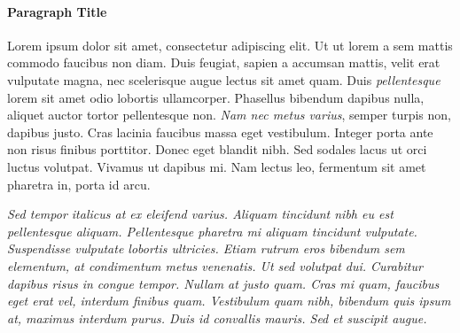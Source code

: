 \documentclass{article}
\begin{document}
\paragraph{Paragraph Title}
  Lorem ipsum dolor sit amet, consectetur adipiscing elit. Ut ut lorem a sem
  mattis commodo faucibus non diam. Duis feugiat, sapien a accumsan mattis,
  velit erat vulputate magna, nec scelerisque augue lectus sit amet quam. 
  Duis \textit{pellentesque} lorem sit amet odio lobortis ullamcorper. 
  Phasellus bibendum dapibus nulla, aliquet auctor tortor pellentesque non. 
  \textit{Nam nec metus varius}, semper turpis non, dapibus 
  justo. Cras lacinia faucibus massa eget vestibulum. Integer porta ante non
  risus finibus porttitor. Donec eget blandit nibh. Sed sodales lacus ut orci
  luctus volutpat. Vivamus ut dapibus mi. Nam lectus leo, fermentum sit amet
  pharetra in, porta id arcu.

  \itshape
  Sed tempor italicus at ex eleifend varius. Aliquam tincidunt nibh eu est
  pellentesque aliquam. Pellentesque pharetra mi aliquam tincidunt vulputate.
  Suspendisse vulputate lobortis ultricies. Etiam rutrum eros bibendum sem
  elementum, at condimentum metus venenatis. Ut sed volutpat dui. Curabitur
  dapibus risus in congue tempor. Nullam at justo quam. Cras mi quam,
  faucibus eget erat vel, interdum finibus quam. Vestibulum quam nibh,
  bibendum quis ipsum at, maximus interdum purus. Duis id convallis mauris.
  Sed et suscipit augue.
\end{document}
